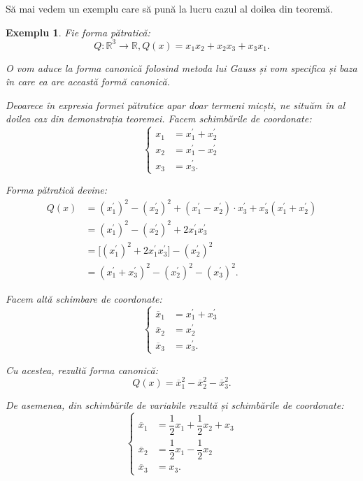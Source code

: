 \documentclass[11pt,a4paper]{article}
\theoremstyle{dotless}
\theoremstyle{dotlessdr}
\newtheorem{example}{Exemplu}[section]
\begin{document}
Să mai vedem un exemplu care să pună la lucru cazul al doilea din teoremă.

\begin{example}
	Fie forma pătratică: 
 \[
	Q : \mathbb{R}^3 \to \mathbb{R}, Q(x) = x_1 x_2 + x_2 x_3 + x_3 x_1.
\]

O vom aduce la forma canonică folosind metoda lui Gauss și vom specifica și
baza în care ea are această formă canonică.

Deoarece în expresia formei pătratice apar doar termeni micști, ne situăm în al
doilea caz din demonstrația teoremei. Facem schimbările de coordonate: 
 \[
	\begin{cases}	
	    x_1 &= x^{\prime}_1 + x^{\prime}_2 \\
	    x_2 &= x^{\prime}_1 - x^{\prime}_2 \\
	    x_3 &= x^{\prime}_3.
    \end{cases}
\]

Forma pătratică devine:
\begin{align*}
Q(x) &= (x^{\prime}_1)^2 - (x^{\prime}_2)^2 + (x^{\prime}_1 - x^{\prime}_2)
        \cdot x^{\prime}_3 + x^{\prime}_3(x^{\prime}_1 + x^{\prime}_2) \\
     &= (x^{\prime}_1)^2 - (x^{\prime}_2)^2 + 2x^{\prime}_1 x^{\prime}_3 \\
     &= \big[ (x^{\prime}_1)^2 + 2x^{\prime}_1 x^{\prime}_3 \big] -
        (x^{\prime}_2)^2 \\
     &= (x^{\prime}_1 + x^{\prime}_3)^2 - (x^{\prime}_2)^2 - (x^{\prime}_3)^2.
\end{align*}

Facem altă schimbare de coordonate: 
 \[
	\begin{cases}	
	    \overline{x}_1 &= x^{\prime}_1 + x^{\prime}_3 \\
	    \overline{x}_2 &= x^{\prime}_2 \\
	    \overline{x}_3 &= x^{\prime}_3.
    \end{cases}
\]

Cu acestea, rezultă forma canonică: 
 \[
	Q(x) = \overline{x}_1^2 - \overline{x}_2^2 - \overline{x}_3^2.
\]

De asemenea, din schimbările de variabile rezultă și schimbările de coordonate: 
 \[
	\begin{cases}	
	    \overline{x}_1 &= \dfrac{1}{2} x_1 + \dfrac{1}{2} x_2 + x_3 \\
	    \overline{x}_2 &= \dfrac{1}{2} x_1 - \dfrac{1}{2} x_2 \\
	    \overline{x}_3 &= x_3.
    \end{cases}
\]
\end{example}
\end{document}
